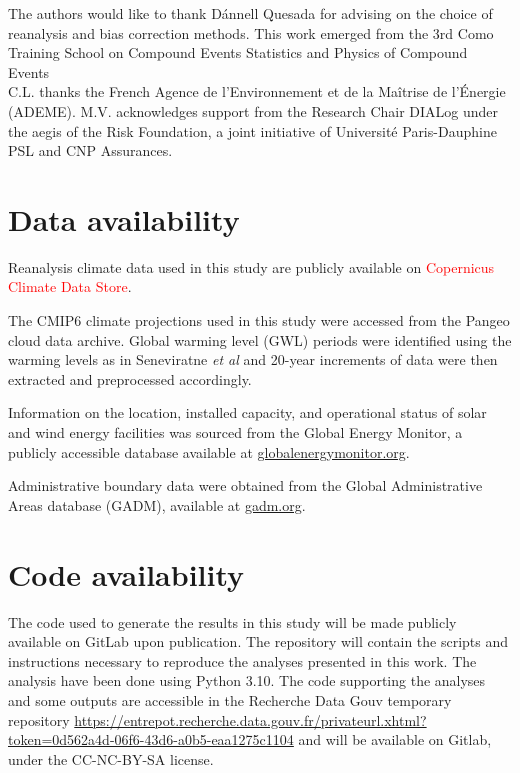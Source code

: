 \documentclass[pdflatex,sn-mathphys-num]{sn-jnl}%
\begin{document}
\clearpage



The authors would like to thank Dánnell Quesada for advising on the choice of reanalysis and bias correction methods.
This work emerged from the 3rd Como Training School on Compound Events Statistics and Physics of Compound Events\\
C.L. thanks the French Agence de l’Environnement et de la Maîtrise de l’Énergie (ADEME). M.V. acknowledges support from the Research Chair DIALog under the aegis of the Risk Foundation, a joint initiative of Université Paris-Dauphine PSL and CNP Assurances.

\section*{Data availability}

Reanalysis climate data used in this study are publicly available on \textcolor{red}{Copernicus Climate Data Store}.

The CMIP6 climate projections used in this study were accessed from the Pangeo cloud data archive. Global warming level (GWL) periods were identified using the warming levels as in Seneviratne \textit{et al} \cite{seneviratneRegionalClimateSensitivity2020}  and 20-year increments of data were then extracted and preprocessed accordingly. 

Information on the location, installed capacity, and operational status of solar and wind energy facilities was sourced from the Global Energy Monitor, a publicly accessible database available at \href{https://globalenergymonitor.org/}{globalenergymonitor.org}.

Administrative boundary data were obtained from the Global Administrative Areas database (GADM), available at \href{https://gadm.org/}{gadm.org}.
 

\section*{Code availability}

The code used to generate the results in this study will be made publicly available on GitLab upon publication. The repository will contain the scripts and instructions necessary to reproduce the analyses presented in this work. 
The analysis have been done using Python 3.10. The code supporting the analyses and some outputs are accessible in the Recherche Data Gouv temporary repository \href{https://entrepot.recherche.data.gouv.fr/privateurl.xhtml?token=0d562a4d-06f6-43d6-a0b5-eaa1275c1104
}{https://entrepot.recherche.data.gouv.fr/privateurl.xhtml?token=0d562a4d-06f6-43d6-a0b5-eaa1275c1104} and will be available on Gitlab, under the CC-NC-BY-SA license.
\end{document}

